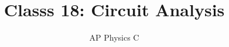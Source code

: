\documentclass[12pt,aspectratio=169]{beamer}
\title{Classs 18: Circuit Analysis}
\subtitle{AP Physics C}
\begin{document}
\begin{frame}
  \maketitle
\end{frame}

%
%  
%
%
%
%
%
%
\end{document}
